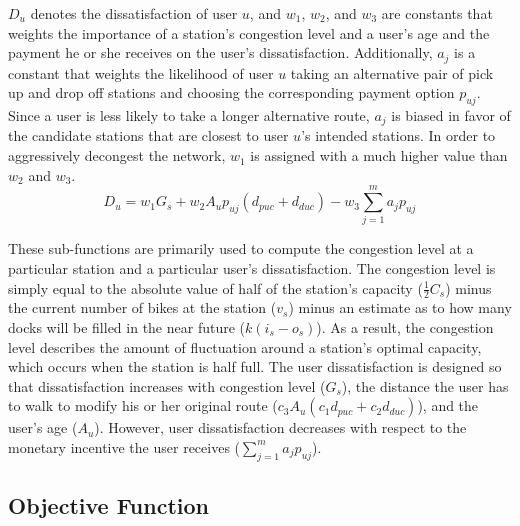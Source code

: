 \documentclass[times, 10pt,twocolumn]{article}
\begin{document}
$D_u$ denotes the dissatisfaction of user $u$, and $w_1$, $w_2$, and $w_3$ are constants that weights the importance of a station's congestion level and a user's age and the payment he or she receives on the user's dissatisfaction. Additionally, $a_j$ is a constant that weights the likelihood of user $u$ taking an alternative pair of pick up and drop off stations and choosing the corresponding payment option $p_{uj}$. Since a user is less likely to take a longer alternative route, $a_j$ is biased in favor of the candidate stations that are closest to user $u$'s intended stations. In order to aggressively decongest the network, $w_1$ is assigned with a much higher value than $w_2$ and $w_3$.
\begin{equation}
D_u = w_1G_s + w_2A_up_{uj}(d_{puc} + d_{duc}) - w_3\sum_{j=1}^{m}a_jp_{uj}
\end{equation}

These sub-functions are primarily used to compute the congestion level at a particular station and a particular user's dissatisfaction. The congestion level is simply equal to the absolute value of half of the station's capacity ($\frac{1}{2}C_s$) minus the current number of bikes at the station ($v_s$) minus an estimate as to how many docks will be filled in the near future ($k(i_s - o_s)$). As a result, the congestion level describes the amount of fluctuation around a station's optimal capacity, which occurs when the station is half full. The user dissatisfaction is designed so that dissatisfaction increases with congestion level ($G_s$), the distance the user has to walk to modify his or her original route ($c_3A_u(c_1d_{puc} + c_2d_{duc})$), and the user's age ($A_u$). However, user dissatisfaction decreases with respect to the monetary incentive the user receives ($\sum_{j=1}^{m}a_jp_{uj}$).

\subsection{Objective Function}
 
\end{document}

